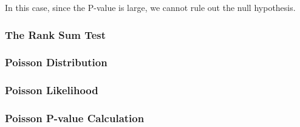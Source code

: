 \documentclass{homework}
\begin{document}
In this case, since the P-value is large, we cannot rule out the null hypothesis. \\

\subsubsection{The Rank Sum Test}

\subsubsection{Poisson Distribution}

\subsubsection{Poisson Likelihood}

\subsubsection{Poisson P-value Calculation}
\end{document}

